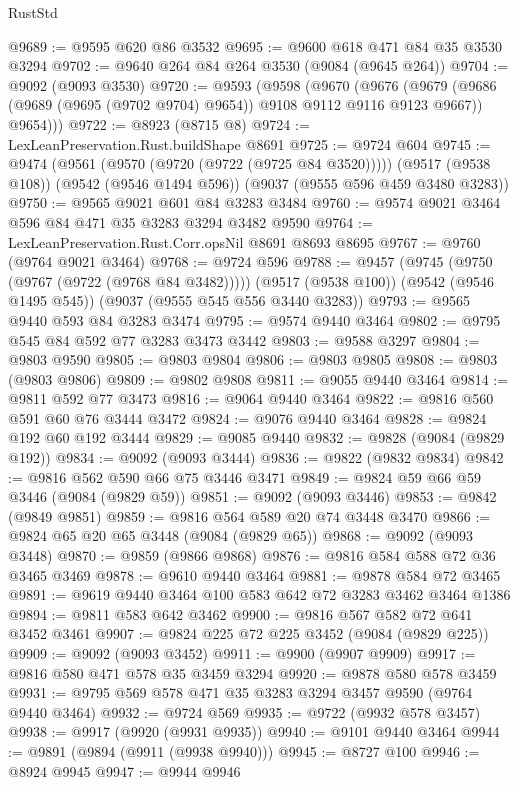 \begin{lexlean}{RustStd}
\begin{coremodule}
@9689 := @9595 @620 @86 @3532
@9695 := @9600 @618 @471 @84 @35 @3530 @3294
@9702 := @9640 @264 @84 @264 @3530 (@9084 (@9645 @264))
@9704 := @9092 (@9093 @3530)
@9720 := @9593
    (@9598
      (@9670
        (@9676
          (@9679 (@9686 (@9689 (@9695 (@9702 @9704) @9654)) @9108 @9112 @9116 @9123 @9667))
          @9654)))
@9722 := @8923 (@8715 @8)
@9724 := LexLeanPreservation.Rust.buildShape @8691
@9725 := @9724 @604
@9745 := @9474
    (@9561 (@9570 (@9720 (@9722 (@9725 @84 @3520)))))
    (@9517 (@9538 @108))
    (@9542 (@9546 @1494 @596))
    (@9037 (@9555 @596 @459 @3480 @3283))
@9750 := @9565 @9021 @601 @84 @3283 @3484
@9760 := @9574 @9021 @3464 @596 @84 @471 @35 @3283 @3294 @3482 @9590
@9764 := LexLeanPreservation.Rust.Corr.opsNil @8691 @8693 @8695
@9767 := @9760 (@9764 @9021 @3464)
@9768 := @9724 @596
@9788 := @9457
    (@9745 (@9750 (@9767 (@9722 (@9768 @84 @3482)))))
    (@9517 (@9538 @100))
    (@9542 (@9546 @1495 @545))
    (@9037 (@9555 @545 @556 @3440 @3283))
@9793 := @9565 @9440 @593 @84 @3283 @3474
@9795 := @9574 @9440 @3464
@9802 := @9795 @545 @84 @592 @77 @3283 @3473 @3442
@9803 := @9588 @3297
@9804 := @9803 @9590
@9805 := @9803 @9804
@9806 := @9803 @9805
@9808 := @9803 (@9803 @9806)
@9809 := @9802 @9808
@9811 := @9055 @9440 @3464
@9814 := @9811 @592 @77 @3473
@9816 := @9064 @9440 @3464
@9822 := @9816 @560 @591 @60 @76 @3444 @3472
@9824 := @9076 @9440 @3464
@9828 := @9824 @192 @60 @192 @3444
@9829 := @9085 @9440
@9832 := @9828 (@9084 (@9829 @192))
@9834 := @9092 (@9093 @3444)
@9836 := @9822 (@9832 @9834)
@9842 := @9816 @562 @590 @66 @75 @3446 @3471
@9849 := @9824 @59 @66 @59 @3446 (@9084 (@9829 @59))
@9851 := @9092 (@9093 @3446)
@9853 := @9842 (@9849 @9851)
@9859 := @9816 @564 @589 @20 @74 @3448 @3470
@9866 := @9824 @65 @20 @65 @3448 (@9084 (@9829 @65))
@9868 := @9092 (@9093 @3448)
@9870 := @9859 (@9866 @9868)
@9876 := @9816 @584 @588 @72 @36 @3465 @3469
@9878 := @9610 @9440 @3464
@9881 := @9878 @584 @72 @3465
@9891 := @9619 @9440 @3464 @100 @583 @642 @72 @3283 @3462 @3464 @1386
@9894 := @9811 @583 @642 @3462
@9900 := @9816 @567 @582 @72 @641 @3452 @3461
@9907 := @9824 @225 @72 @225 @3452 (@9084 (@9829 @225))
@9909 := @9092 (@9093 @3452)
@9911 := @9900 (@9907 @9909)
@9917 := @9816 @580 @471 @578 @35 @3459 @3294
@9920 := @9878 @580 @578 @3459
@9931 := @9795 @569 @578 @471 @35 @3283 @3294 @3457 @9590 (@9764 @9440 @3464)
@9932 := @9724 @569
@9935 := @9722 (@9932 @578 @3457)
@9938 := @9917 (@9920 (@9931 @9935))
@9940 := @9101 @9440 @3464
@9944 := @9891 (@9894 (@9911 (@9938 @9940)))
@9945 := @8727 @100
@9946 := @8924 @9945
@9947 := @9944 @9946

\end{coremodule}
\end{lexlean}
